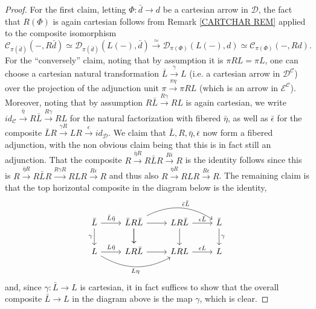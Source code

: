\documentclass[a4paper,10pt
,draft
]{article}%
\numberwithin{equation}{section}
\numberwithin{figure}{section}
\theoremstyle{definition} %
\newcommand{\1}{\ensuremath{\mathbbm 1}}%
\begin{document}
\begin{proof}
For the first claim, 
letting $\Phi \colon \bar{d} \to d$ be a cartesian arrow
in $\mathcal{D}$, 
the fact that $R(\Phi)$ is again cartesian follows from
Remark \ref{CARTCHAR REM} applied to the composite isomorphism
\[
\mathcal{C}_{\pi(\bar{d})}
	\left(-,R\bar{d}\right)
	\simeq 
\mathcal{D}_{\pi(\bar{d})}
	\left(L(-),\bar{d}\right)
	\xrightarrow{\simeq}
\mathcal{D}_{\pi(\Phi)}\left(L(-),d\right)
	\simeq
\mathcal{C}_{\pi(\Phi)}\left(-,Rd\right).
\]
For the ``conversely'' claim,
noting that by assumption it is $\pi RL = \pi L$,
one can choose a cartesian natural transformation 
$\bar{L} \xrightarrow{\gamma} L$
(i.e. a cartesian arrow in $\mathcal{D}^{\mathcal{C}}$)
over the projection of the adjunction unit
$\pi \xrightarrow{\pi \eta} \pi RL$
(which is an arrow in $\mathcal{E}^{\mathcal{C}}$).
Moreover, noting that by assumption
$R\bar{L} \xrightarrow{R \gamma} RL$ is again cartesian,
we write
$id_{\mathcal{C}} \xrightarrow{\bar{\eta}} 
R \bar{L} \xrightarrow{R \gamma} RL$
for the natural factorization
with fibered $\bar{\eta}$,
as well as $\bar{\epsilon}$ for the composite
$\bar{L}R \xrightarrow{\gamma R} 
LR \xrightarrow{\epsilon} id_{\mathcal{D}}$.
We claim that $\bar{L},R,\bar{\eta},\bar{\epsilon}$
now form a fibered adjunction, with the non obvious claim being that this is in fact still an adjunction.
That the composite
$R\xrightarrow{\bar{\eta}R} R\bar{L}R \xrightarrow{R\bar{\epsilon}} R$
is the identity follows since this is 
$R \xrightarrow{\bar{\eta} R} R\bar{L}R 
\xrightarrow{R \gamma R} RLR \xrightarrow{R \epsilon} R$ 
and thus also $R \xrightarrow{\eta R} RLR \xrightarrow{R \epsilon} R$.
The remaining claim is that the top horizontal composite in the diagram below is the identity, 
\begin{equation}
\begin{tikzcd}
		\bar{L} \ar{d}[swap]{\gamma} \arrow{r}{\bar{L}\bar{\eta}}
	&
		\bar{L} R \bar{L} \arrow[d] \ar{r} \ar{d}
		\arrow[bend left]{rr}{\bar{\epsilon}\bar{L}}
	&
		L R \bar{L} \ar{r}{\epsilon \bar{L}} \ar{d}
	&
		\bar{L} \ar{d}{\gamma}
\\
		L \arrow{r}{L\bar{\eta}}
		\arrow[bend right]{rr}[swap]{L \eta}
	&
		LR\bar{L} \ar{r}
	&
		LRL \ar{r}{\epsilon L}
	&
		L
\end{tikzcd}
\end{equation}
and, since 
$\gamma \colon \bar{L} \to L$ is cartesian, 
it in fact suffices to show that the overall composite 
$\bar{L} \to L$ in the diagram above
is the map $\gamma$, which is clear. 
\end{proof}
\end{document}
